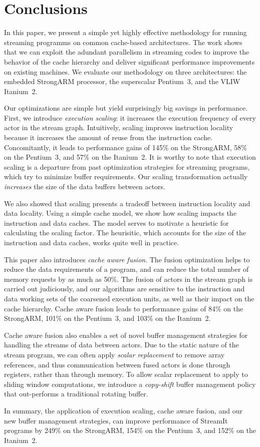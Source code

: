 \section{Conclusions}
\label{sec:conclusion}

In this paper, we present a simple yet highly effective methodology
for running streaming programms on common cache-based architectures.
The work shows that we can exploit the adundant parallelism in
streaming codes to improve the behavior of the cache hierarchy and
deliver significant performance improvements on existing machines. We
evaluate our methodology on three architectures: the embedded
StrongARM processor, the superscalar Pentium~3, and the VLIW Itanium~2.

Our optimizations are simple but yield surprisingly big savings in
performance. First, we introduce {\it execution scaling}: it 
increases the execution frequency of every actor in the stream
graph. Intuitively, scaling improves instruction  locality because
it increases the amount of reuse from the instruction
cache. Concomitantly, it leads to performance gains of 145\% on the
StrongARM, 58\% on the Pentium~3, and 57\% on the Itanium~2.
It is worthy to note that execution scaling is a departure from
past optimization strategies for streaming programs, which try to
minimize buffer requirements. Our scaling transformation actually {\it
increases} the size of the data buffers between actors.

We also showed that scaling presents a tradeoff between 
instruction locality and data locality. Using a simple cache
model, we show how scaling impacts the instruction and data
caches. The model serves to motivate a heuristic for calculating the
scaling factor. The heurisitic, which accounts for the size of the
instruction and data caches, works quite well in practice.

This paper also introduces {\it cache aware fusion}. The fusion
optimization helps to reduce the data requirements of a program, and
can reduce the total number of memory requests by as much as 50\%. The
fusion of actors in the stream graph is carried out judiciously, and
our algorithms are sensitive to the instruction and data working sets
of the coarsened execution units, as well as their impact on the cache
hierarchy. Cache aware fusion leads to performance gains of 84\% on
the StrongARM, 101\% on the Pentium~3, and 103\% on the Itanium~2.

Cache aware fusion also enables a set of novel buffer management
strategies for handling the streams of data between actors. Due to the
static nature of the stream program, we can often apply {\it scalar
  replacement} to remove array references, and thus communication
between fused actors is done through registers, rather than through
memory.  To allow scalar replacement to apply to sliding window 
computations, we introduce a {\it copy-shift} buffer management policy
that out-performs a traditional rotating buffer.

In summary, the application of execution scaling, cache aware fusion, and our
new buffer management strategies, can improve performance of
StreamIt programs by 249\% on the StrongARM, 154\% on the Pentium~3,
and 152\% on the Itanium~2.
